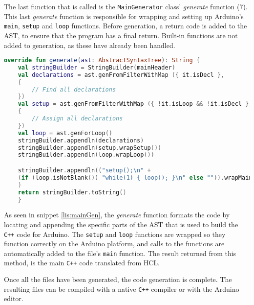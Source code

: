 The last function that is called is the \texttt{MainGenerator} class' \textit{generate} function (7). 
This last \textit{generate} function is responsible for wrapping and setting up Arduino's \texttt{main}, \texttt{setup} and \texttt{loop} functions.
Before generation, a return code is added to the AST, to ensure that the program has a final return.
Built-in functions are not added to generation, as these have already been handled. 


\begin{lstlisting}[language=Kotlin,label=lis:mainGen,caption=The implementation of \textit{generate} in \texttt{MainGenerator}.]
override fun generate(ast: AbstractSyntaxTree): String {
	val stringBuilder = StringBuilder(mainHeader)
	val declarations = ast.genFromFilterWithMap ({ it.isDecl }, 
	{
		// Find all declarations	
	})
	val setup = ast.genFromFilterWithMap ({ !it.isLoop && !it.isDecl }, 
	{
	    // Assign all declarations
	})
	val loop = ast.genForLoop()
	stringBuilder.appendln(declarations)
	stringBuilder.appendln(setup.wrapSetup())
	stringBuilder.appendln(loop.wrapLoop())

	stringBuilder.appendln(("setup();\n" +
	(if (loop.isNotBlank()) "while(1) { loop(); }\n" else "")).wrapMain()
	)
	return stringBuilder.toString()
	}
\end{lstlisting}

As seen in snippet \ref{lis:mainGen}, the \textit{generate} function formats the code by locating and appending the specific parts of the AST that is used to build the \texttt{C++} code for Arduino.
The \texttt{setup} and \texttt{loop} functions are wrapped so they function correctly on the Arduino platform, and calls to the functions are automatically added to the file's \texttt{main} function. 
The result returned from this method, is the main \texttt{C++} code translated from HCL. 

Once all the files have been generated, the code generation is complete.
The resulting files can be compiled with a native \texttt{C++} compiler or with the Arduino editor.

